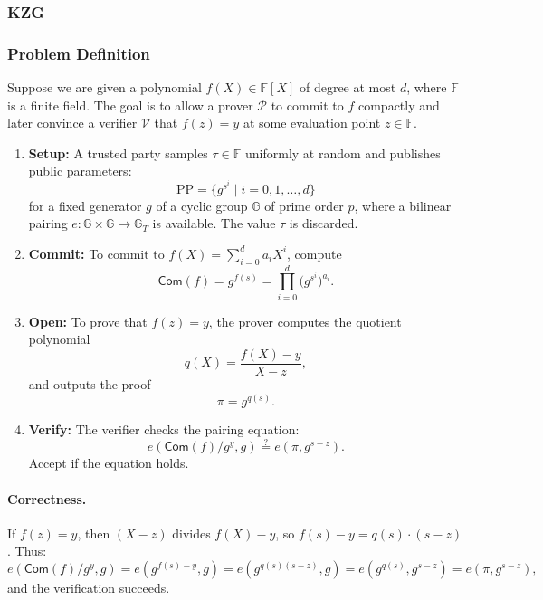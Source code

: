 \subsubsection{KZG}

\subsubsection*{Problem Definition}

Suppose we are given a polynomial $f(X) \in \mathbb{F}[X]$ of degree at most $d$, where $\mathbb{F}$ is a finite field.  
The goal is to allow a prover $\mathcal{P}$ to commit to $f$ compactly and later convince a verifier $\mathcal{V}$ that $f(z)=y$ at some evaluation point $z \in \mathbb{F}$.

\begin{protocol}
\begin{enumerate}
  \item \textbf{Setup:}  
  A trusted party samples $\tau \in \mathbb{F}$ uniformly at random and publishes public parameters:
  \[
  \text{PP} = \{ g^{s^i} \mid i=0,1,\dots,d \}
  \]
  for a fixed generator $g$ of a cyclic group $\mathbb{G}$ of prime order $p$, where a bilinear pairing $e:\mathbb{G}\times \mathbb{G}\to \mathbb{G}_T$ is available.  
  The value $\tau$ is discarded.

  \item \textbf{Commit:}  
  To commit to $f(X)=\sum_{i=0}^d a_i X^i$, compute
  \[
  \mathsf{Com}(f) = g^{f(s)} = \prod_{i=0}^d \big(g^{s^i}\big)^{a_i}.
  \]

  \item \textbf{Open:}  
  To prove that $f(z)=y$, the prover computes the quotient polynomial
  \[
  q(X) = \frac{f(X) - y}{X-z},
  \]
  and outputs the proof
  \[
  \pi = g^{q(s)}.
  \]

  \item \textbf{Verify:}  
  The verifier checks the pairing equation:
  \[
  e(\mathsf{Com}(f)/g^y, g) \stackrel{?}{=} e(\pi, g^{s-z}).
  \]
  Accept if the equation holds.
\end{enumerate}
\end{protocol}

\paragraph{Correctness.}

If $f(z)=y$, then $(X-z)$ divides $f(X)-y$, so $f(s)-y = q(s)\cdot(s-z)$.  
Thus:
\[
e(\mathsf{Com}(f)/g^y, g) = e(g^{f(s)-y}, g) = e(g^{q(s)(s-z)}, g) = e(g^{q(s)}, g^{s-z}) = e(\pi, g^{s-z}),
\]
and the verification succeeds.

